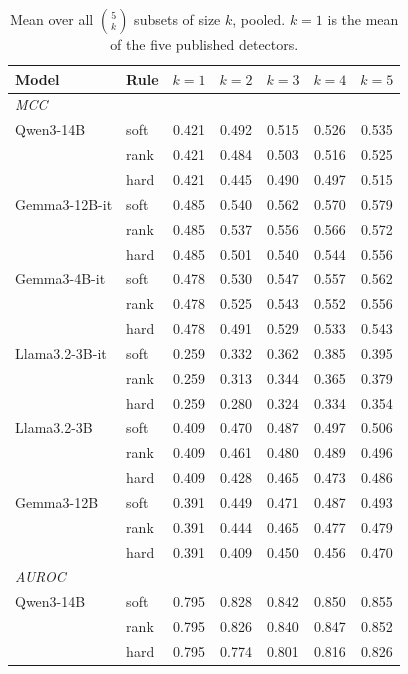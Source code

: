 \begin{table}[h]\centering\footnotesize
  \caption{Mean over all $\binom{5}{k}$ subsets of size $k$, pooled. $k{=}1$ is the
  mean of the five published detectors.}
  \begin{tabular}{l l c c c c c}
    \hline
    Model & Rule & $k{=}1$ & $k{=}2$ & $k{=}3$ & $k{=}4$ & $k{=}5$ \\
    \hline
    \multicolumn{7}{l}{\itshape MCC} \\
    Qwen3-14B & soft & 0.421 & 0.492 & 0.515 & 0.526 & 0.535 \\
     & rank & 0.421 & 0.484 & 0.503 & 0.516 & 0.525 \\
     & hard & 0.421 & 0.445 & 0.490 & 0.497 & 0.515 \\
    Gemma3-12B-it & soft & 0.485 & 0.540 & 0.562 & 0.570 & 0.579 \\
     & rank & 0.485 & 0.537 & 0.556 & 0.566 & 0.572 \\
     & hard & 0.485 & 0.501 & 0.540 & 0.544 & 0.556 \\
    Gemma3-4B-it & soft & 0.478 & 0.530 & 0.547 & 0.557 & 0.562 \\
     & rank & 0.478 & 0.525 & 0.543 & 0.552 & 0.556 \\
     & hard & 0.478 & 0.491 & 0.529 & 0.533 & 0.543 \\
    Llama3.2-3B-it & soft & 0.259 & 0.332 & 0.362 & 0.385 & 0.395 \\
     & rank & 0.259 & 0.313 & 0.344 & 0.365 & 0.379 \\
     & hard & 0.259 & 0.280 & 0.324 & 0.334 & 0.354 \\
    Llama3.2-3B & soft & 0.409 & 0.470 & 0.487 & 0.497 & 0.506 \\
     & rank & 0.409 & 0.461 & 0.480 & 0.489 & 0.496 \\
     & hard & 0.409 & 0.428 & 0.465 & 0.473 & 0.486 \\
    Gemma3-12B & soft & 0.391 & 0.449 & 0.471 & 0.487 & 0.493 \\
     & rank & 0.391 & 0.444 & 0.465 & 0.477 & 0.479 \\
     & hard & 0.391 & 0.409 & 0.450 & 0.456 & 0.470 \\
    \hline
    \multicolumn{7}{l}{\itshape AUROC} \\
    Qwen3-14B & soft & 0.795 & 0.828 & 0.842 & 0.850 & 0.855 \\
     & rank & 0.795 & 0.826 & 0.840 & 0.847 & 0.852 \\
     & hard & 0.795 & 0.774 & 0.801 & 0.816 & 0.826 \\

\end{tabular}
\end{table}
